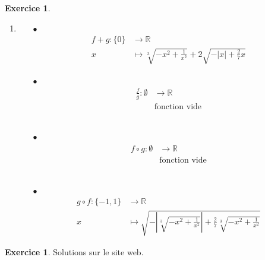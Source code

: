 \documentclass[a4paper,13pt]{scrreprt}
\theoremstyle{plain}
\theoremstyle{definition}
\newtheorem{exo}[subsection]{Exercice}
\newcommand{\rr}{\mathbb{R}}
\begin{document}
\begin{exo}
\begin{enumerate}
		\item \begin{itemize}
			\item [$\bullet$] \begin{align*}
			f + g : \{0\} &\to \rr \\
			x &\mapsto \sqrt[3]{-x^2+\frac{1}{x^2}} + 2\sqrt{-|x|+\frac{2}{7}x}
			\end{align*}
			\item [$\bullet$] \begin{align*}
			\frac{f}{g} : \emptyset &\to \rr \\
			&\text{fonction vide}
			\end{align*} \\
			\item [$\bullet$] \begin{align*}
			f \circ g : \emptyset &\to \rr \\
			&\text{fonction vide}
			\end{align*} \\
			\item [$\bullet$] \begin{align*}
			g \circ f : \{-1,1\} &\to \rr \\
			x &\mapsto \sqrt{-|\sqrt[3]{-x^2+\frac{1}{x^2}}|+\frac{2}{7}\sqrt[3]{-x^2+\frac{1}{x^2}}}
			\end{align*}
		\end{itemize}
	\end{enumerate}
\end{exo}

\begin{exo}
	Solutions sur le site web.
\end{exo}
\end{document}
